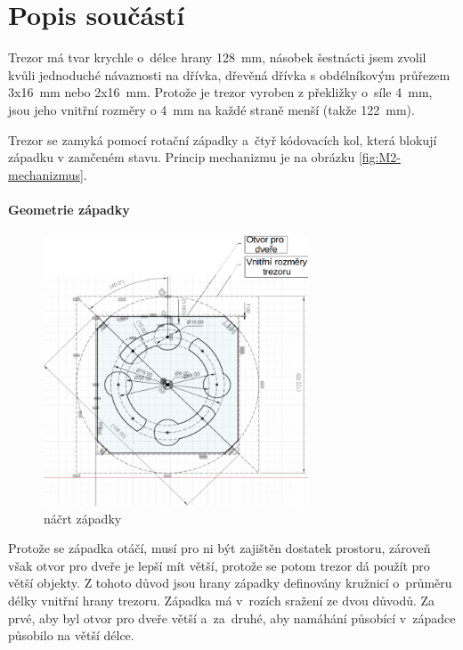 \section{Popis součástí}

Trezor má tvar krychle o~délce hrany 128~mm, násobek šestnácti jsem zvolil kvůli jednoduché návaznosti na dřívka, %
dřevěná dřívka s obdélníkovým průřezem 3x16~mm nebo 2x16~mm.
Protože je trezor vyroben z překližky o~síle 4~mm, jsou jeho vnitřní rozměry o 4~mm na každé straně menší (takže 122~mm).

Trezor se zamyká pomocí rotační západky a~čtyř kódovacích kol, která blokují západku v zamčeném stavu. 
Princip mechanizmu je na obrázku \ref{fig:M2-mechanizmus}.


\paragraph{Geometrie západky}
\begin{figure}[h]
	\centering
    \includegraphics[width=0.7\textwidth]{kapitoly/obrazky/M3/geometrie_zapadky.png}
    \caption{náčrt západky} %
    \label{fig:M3-geometrie-zapadky}
\end{figure} 

Protože se západka otáčí, musí pro ni být zajištěn dostatek prostoru, zároveň však otvor pro dveře je lepší mít větší, protože se potom trezor dá použít pro větší objekty.
Z tohoto důvod jsou hrany západky definovány kružnicí o~průměru délky vnitřní hrany trezoru. Západka má v~rozích sražení ze dvou důvodů. Za prvé, aby byl otvor pro
dveře větší a~za~druhé, aby namáhání působící v~západce působilo na větší délce.


